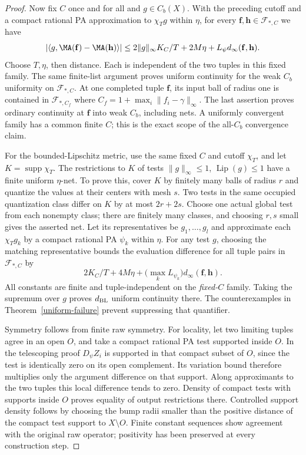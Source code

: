 \begin{proof}
Now fix $C$ once and for all and $g\in C_b(X)$. With the preceding
cutoff and a compact rational PA approximation to $\chi_Tg$ within
$\eta$, for every $\mathbf f,\mathbf h\in\mathcal F_{*,C}$ we have
\begin{equation}\label{weak-fixed-C}
 |\langle g,\MA(\mathbf f)-\MA(\mathbf h)\rangle|
 \leq2\|g\|_\infty K_C/T+2M\eta+
                          L_\psi d_\infty(\mathbf f,\mathbf h).
\end{equation}
Choose $T,\eta$, then distance. Each is independent of the two tuples
in this fixed family. The same finite-list argument proves uniform
continuity for the weak $C_b$ uniformity on $\mathcal F_{*,C}$.
At one completed tuple $\mathbf f$, its input ball of radius one is
contained in $\mathcal F_{*,C_f}$ where
$C_f=1+\max_i\|f_i-\gamma\|_\infty$.
The last assertion proves ordinary continuity at $\mathbf f$ into
weak $C_b$, including nets. A uniformly convergent family has a common
finite $C$; this is the exact scope of the all-$C_b$ convergence claim.

For the bounded-Lipschitz metric, use the same fixed $C$ and cutoff
$\chi_T$, and let $K=\operatorname{supp}\chi_T$.
The restrictions to $K$ of tests $\|g\|_\infty\leq1$,
$\operatorname{Lip}(g)\leq1$ have a finite uniform $\eta$-net.
To prove this, cover $K$ by finitely many balls of radius $r$ and
quantize the values at their centers with mesh $s$. Two tests in the
same occupied quantization class differ on $K$ by at most $2r+2s$.
Choose one actual global test from each nonempty class; there are finitely
many classes, and choosing $r,s$ small gives the asserted net.
Let its representatives be $g_1,\ldots,g_l$ and approximate each
$\chi_Tg_k$ by a compact rational PA $\psi_k$ within $\eta$.
For any test $g$, choosing the matching representative bounds the
evaluation difference for all tuple pairs in $\mathcal F_{*,C}$ by
\[
 2K_C/T+4M\eta+
       \bigl(\max_k L_{\psi_k}\bigr)d_\infty(\mathbf f,\mathbf h).
\]
All constants are finite and tuple-independent on the \emph{fixed-$C$}
family. Taking the supremum over $g$ proves $d_{\rm BL}$ uniform
continuity there. The counterexamples in Theorem~\ref{uniform-failure}
prevent suppressing that quantifier.

Symmetry follows from finite raw symmetry. For locality, let two limiting
tuples agree in an open $O$, and take a compact rational PA test supported
inside $O$. In the telescoping proof $D_\psi Z_i$ is supported in that
compact subset of $O$, since the test is identically zero on its open
complement. Its variation bound therefore multiplies only the argument
difference on that support. Along approximants to the two tuples this
local difference tends to zero. Density of compact tests with supports
inside $O$ proves equality of output restrictions there. Controlled
support density follows by choosing the bump radii smaller than the
positive distance of the compact test support to $X\setminus O$.
Finite constant sequences show agreement with the original raw operator;
positivity has been preserved at every construction step.


\end{proof}
